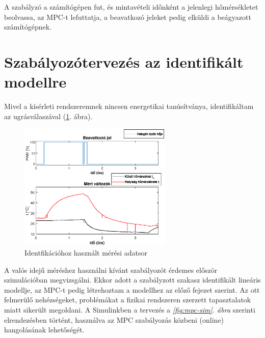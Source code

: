 
A szabályzó a számítógépen fut, és mintavételi időnként a jelenlegi hőmérsékletet beolvassa, az MPC-t lefuttatja, a beavatkozó jeleket pedig elküldi a beágyazott számítógépnek.






\section{Szabályozótervezés az identifikált modellre}
Mivel a kísérleti rendszeremnek nincsen energetikai tanúsítványa, identifikáltam az ugrásválaszával (\ref{fig:realsys-ident}. ábra).

\begin{figure}
	\centering
	\includegraphics[width=0.65\textwidth]{figures/realsys/ident}
	\caption{Identfikációhoz használt mérési adatsor}
	\label{fig:realsys-ident}
\end{figure}

A valós idejű méréshez használni kívánt szabályozót érdemes először szimulációban megvizsgálni. Ekkor adott a szabályzott szakasz identifikált lineáris modellje, az MPC-t pedig létrehoztam  a modellhez az előző fejezet szerint. Az ott felmerülő nehézségeket, problémákat a fizikai rendszeren szerzett tapasztalatok miatt sikerült megoldani. A Simulinkben a tervezés a \textit{\ref{fig:mpc-sim}. ábra} szerinti elrendezésben történt, használva az MPC szabályozás közbeni (online) hangolásának lehetőségét.



